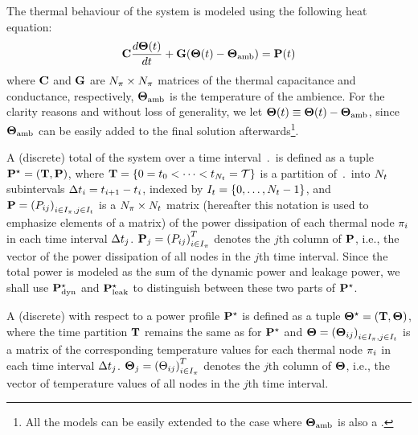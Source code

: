 The thermal behaviour of the system is modeled using the following heat equation:
\begin{equation} \equlabel{fourier}
  \mcapacitance \frac{d\vtemperature(\time)}{d\time} + \mconductance (\vtemperature(\time) - \vtemperature_\amb) = \vpower(\time)
\end{equation}
where $\mathbf{C}$ and $\mathbf{G}$ are $N_\pi \times N_\pi$ matrices of the thermal capacitance and conductance, respectively, $\mathbf{\Theta}_{\text{amb}}$ is the temperature of the ambience. For the clarity reasons and without loss of generality, we let $\mathbf{\Theta}(t) \equiv \mathbf{\Theta}(t) - \mathbf{\Theta}_{\text{amb}}$, since $\mathbf{\Theta}_{\text{amb}}$ can be easily added to the final solution afterwards\footnote{All the models can be easily extended to the case where $\mathbf{\Theta}_{\text{amb}}$ is also a \mnrv.}.

A (discrete) total  of the system over a time interval $\period$ is defined as a tuple $\mathbf{P}^\star = (\mathbf{T}, \mathbf{P})$, where $\mathbf{T} = \{ 0 = t_0 < \dots < t_{N_t} = \mathcal{T} \}$ is a partition of $\period$ into $N_t$ subintervals $\Delta t_i = t_{i+1} - t_i$, indexed by $I_t = \{ 0, \dots, N_t - 1 \}$, and $\mathbf{P} = \left(P_{ij}\right)_{i \in I_\pi, j \in I_t}$ is a $N_\pi \times N_t$ matrix (hereafter this notation is used to emphasize elements of a matrix) of the power dissipation of each thermal node $\pi_i$ in each time interval $\Delta t_j$. $\mathbf{P}_j = \left(P_{ij}\right)^T_{i \in I_\pi}$ denotes the $j$th column of $\mathbf{P}$, i.e., the vector of the power dissipation of all nodes in the $j$th time interval. Since the total power is modeled as the sum of the dynamic power and leakage power, we shall use $\mathbf{P}^\star_{\text{dyn}}$ and $\mathbf{P}^\star_{\text{leak}}$ to distinguish between these two parts of $\mathbf{P}^\star$.

A (discrete)  with respect to a power profile $\mathbf{P}^\star$ is defined as a tuple $\mathbf{\Theta}^\star = (\mathbf{T}, \mathbf{\Theta})$, where the time partition $\mathbf{T}$ remains the same as for $\mathbf{P}^\star$ and $\mathbf{\Theta} = \left(\mathbf{\Theta}_{ij}\right)_{i \in I_\pi, j \in I_t}$ is a matrix of the corresponding temperature values for each thermal node $\pi_i$ in each time interval $\Delta t_j$. $\mathbf{\Theta}_j = \left(\Theta_{ij}\right)^T_{i \in I_\pi}$ denotes the $j$th column of $\mathbf{\Theta}$, i.e., the vector of temperature values of all nodes in the $j$th time interval.

